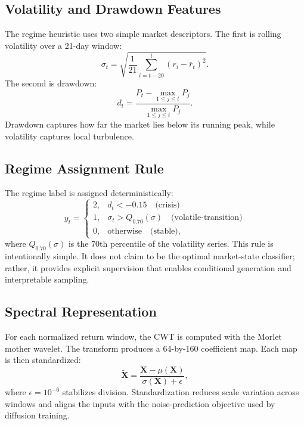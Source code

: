 \documentclass[conference]{IEEEtran}
\begin{document}
\subsection{Volatility and Drawdown Features}
The regime heuristic uses two simple market descriptors. The first is rolling volatility over a 21-day window:
\begin{equation}
\sigma_t = \sqrt{\frac{1}{21}\sum_{i=t-20}^{t}(r_i-\bar{r}_t)^2}.
\end{equation}
The second is drawdown:
\begin{equation}
d_t = \frac{P_t - \max_{1 \leq j \leq t} P_j}{\max_{1 \leq j \leq t} P_j}.
\end{equation}
Drawdown captures how far the market lies below its running peak, while volatility captures local turbulence.

\subsection{Regime Assignment Rule}
The regime label is assigned deterministically:
\begin{equation}
y_t =
\begin{cases}
2, & d_t < -0.15 \quad \text{(crisis)}\\
1, & \sigma_t > Q_{0.70}(\sigma) \quad \text{(volatile-transition)}\\
0, & \text{otherwise} \quad \text{(stable)},
\end{cases}
\end{equation}
where $Q_{0.70}(\sigma)$ is the 70th percentile of the volatility series. This rule is intentionally simple. It does not claim to be the optimal market-state classifier; rather, it provides explicit supervision that enables conditional generation and interpretable sampling.

\subsection{Spectral Representation}
For each normalized return window, the CWT is computed with the Morlet mother wavelet. The transform produces a 64-by-160 coefficient map. Each map is then standardized:
\begin{equation}
\widetilde{\mathbf{X}} = \frac{\mathbf{X} - \mu(\mathbf{X})}{\sigma(\mathbf{X}) + \epsilon},
\end{equation}
where $\epsilon = 10^{-6}$ stabilizes division. Standardization reduces scale variation across windows and aligns the inputs with the noise-prediction objective used by diffusion training.
\end{document}
